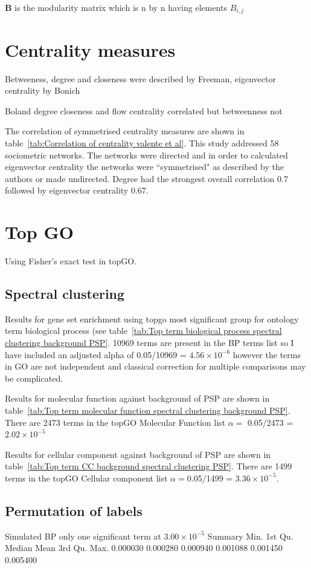 $\mathbf{B}$ is the modularity matrix which is n by n having elements $B_{i,j}$



\section{Centrality measures}
Betweeness, degree and closeness were described by Freeman, eigenvector centrality by Bonich \cite{valente2008correlated}

Boland degree closeness and flow centrality correlated but betweenness not

The correlation of symmetrised centrality measures are shown in table~\ref{tab:Correlation of centrality valente et al}. This study addressed 58 sociometric networks. The networks were directed and in order to calculated eigenvector centrality the networks were ``symmetrised" as described by the authors or made undirected. Degree had the strongest overall correlation 0.7 followed by eigenvector centrality 0.67.

\section{Top GO}
Using Fisher's exact test in topGO.
\subsection{Spectral clustering}

Results for gene set enrichment using topgo most significant group for ontology term biological process (see table~\ref{tab:Top term biological process spectral clustering background PSP}. 10969 terms are present in the BP terms list so I have included an adjusted alpha of 0.05/10969 = $4.56 \times 10^{-6}$ however the terms in GO are not independent and classical correction for multiple comparisons may be complicated. 

Results for molecular function against background of PSP are shown in table~\ref{tab:Top term molecular function spectral clustering background PSP}. There are 2473 terms in the topGO Molecular Function list $\alpha=$ 0.05/2473 = $2.02 \times 10^{-5}$

Results for cellular component against background of PSP are shown in table~\ref{tab:Top term CC background spectral clustering PSP}. There are 1499 terms in the topGO Cellular component list $\alpha=$0.05/1499 = $3.36 \times 10^{-5}$.


\subsection{Permutation of labels}
Simulated 
BP only one significant term at $3.00 \times 10^{-5}$
Summary
   Min.  1st Qu.   Median     Mean  3rd Qu.     Max. 
0.000030 0.000280 0.000940 0.001088 0.001450 0.005400 


